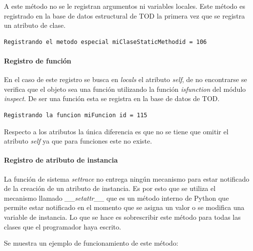 \documentclass[12pt,legalpaper]{report}
\begin{document}
A este método no se le registran argumentos ni variables locales.  Este método es registrado en la base de datos estructural de TOD la primera vez que se registra un atributo de clase.

\begin{singlespace}
\begin{lstlisting}[style=consola,numbers=none]
Registrando el metodo especial miClaseStaticMethodid = 106
\end{lstlisting}
\end{singlespace}

				
				\paragraph{Registro de función}
				
En el caso de este registro se busca en \textit{locals} el atributo \textit{self}, de no encontrarse se verifica que el objeto sea una función utilizando la función \textit{isfunction} del módulo \textit{inspect}.  De ser una función esta se registra en la base de datos de TOD.			

\begin{singlespace}
\begin{lstlisting}[style=consola,numbers=none]
Registrando la funcion miFuncion id = 115
\end{lstlisting}
\end{singlespace}

Respecto a los atributos la única diferencia es que no se tiene que omitir el atributo \textit{self} ya que para funciones este no existe.


				\paragraph{Registro de atributo de instancia\label{registerField}}

La función de sistema \textit{settrace} no entrega ningún mecanismo para estar notificado de la creación de un atributo de instancia.  Es por esto que se utiliza el mecanismo llamado \textit{\_\_setattr\_\_} que es un método interno de Python \cite{setattr} que permite estar notificado en el momento que se asigna un valor o se modifica una variable de instancia.  Lo que se hace es sobrescribir este método para todas las clases que el programador haya escrito.

Se muestra un ejemplo de funcionamiento de este método:
\end{document}
